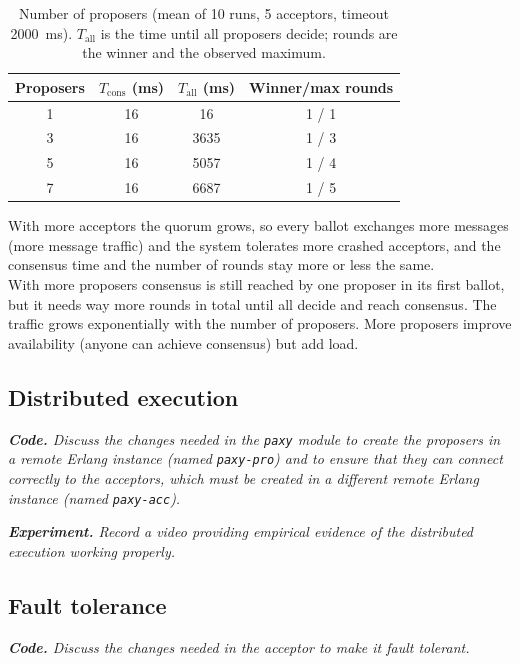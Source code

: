 \documentclass[a4paper, 10pt]{article}
\begin{document}
\begin{table}[htbp]
\centering
\small
\begin{tabular}{c|c|c|c}
\hline
Proposers & $T_{\mathrm{cons}}$ (ms) & $T_{\mathrm{all}}$ (ms) & Winner/max rounds \\
\hline
1 & 16 & 16 & 1 / 1 \\
3 & 16 & 3635 & 1 / 3 \\
5 & 16 & 5057 & 1 / 4 \\
7 & 16 & 6687 & 1 / 5 \\
\hline
\end{tabular}
\caption{Number of proposers (mean of 10 runs, 5 acceptors, timeout 2000~ms).
$T_{\mathrm{all}}$ is the time until all proposers decide; rounds are the
winner and the observed maximum.}
\label{tab:proposers}
\end{table}

\noindent With more acceptors the quorum grows, so every ballot exchanges more messages (more message traffic) and the system tolerates more crashed acceptors, and the consensus time and the number of rounds stay more or less the same. \\

\noindent With more proposers consensus is still reached by one proposer in its first ballot, but it needs way more rounds in total until all decide and reach consensus. The traffic grows exponentially with the number of proposers. More proposers improve availability (anyone can achieve consensus) but add load.

\subsection{Distributed execution}

\textit{\textbf{Code.} Discuss the changes needed in the \texttt{paxy} module to create the proposers in a remote Erlang instance (named \texttt{paxy-pro}) and to ensure that they can connect correctly to the acceptors, which must be created in a different remote Erlang instance (named \texttt{paxy-acc}).}

{\setlength{\parskip}{10pt}\noindent\textit{\textbf{Experiment.} Record a video providing empirical evidence of the distributed execution working properly.}}

\subsection{Fault tolerance}

\textit{\textbf{Code.} Discuss the changes needed in the acceptor to make it fault tolerant.}
\end{document}
